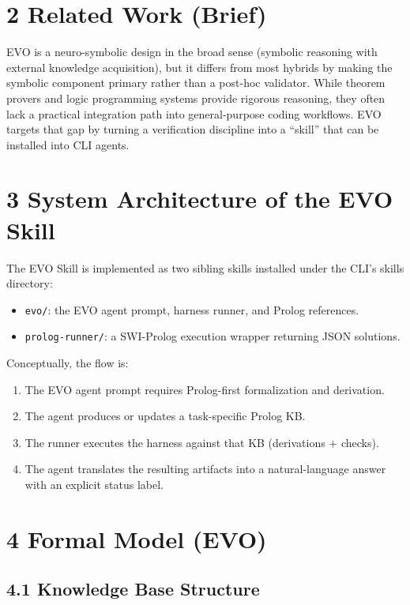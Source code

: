 \documentclass[12pt,a4paper]{article}
\begin{document}
\section{2 Related Work (Brief)}

EVO is a neuro-symbolic design in the broad sense (symbolic reasoning with external knowledge acquisition), but it differs from most hybrids by making the symbolic component primary rather than a post-hoc validator. While theorem provers and logic programming systems provide rigorous reasoning, they often lack a practical integration path into general-purpose coding workflows. EVO targets that gap by turning a verification discipline into a ``skill'' that can be installed into CLI agents.

\section{3 System Architecture of the EVO Skill}

The EVO Skill is implemented as two sibling skills installed under the CLI's skills directory:
\begin{itemize}[leftmargin=*,topsep=2pt,itemsep=2pt]
\item \texttt{evo/}: the EVO agent prompt, harness runner, and Prolog references.
\item \texttt{prolog-runner/}: a SWI-Prolog execution wrapper returning JSON solutions.
\end{itemize}

Conceptually, the flow is:
\begin{enumerate}[leftmargin=*,topsep=2pt,itemsep=2pt]
\item The EVO agent prompt requires Prolog-first formalization and derivation.
\item The agent produces or updates a task-specific Prolog KB.
\item The runner executes the harness against that KB (derivations + checks).
\item The agent translates the resulting artifacts into a natural-language answer with an explicit status label.
\end{enumerate}

\section{4 Formal Model (EVO)}

\subsection{4.1 Knowledge Base Structure}
\end{document}
